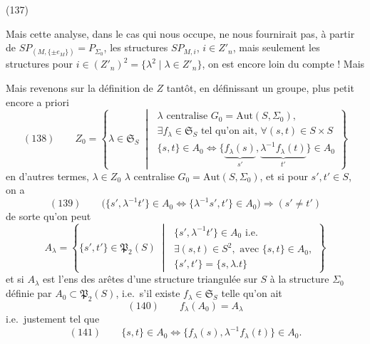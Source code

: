 \documentclass[11pt,a4paper]{article}
\begin{document}
(137)


Mais cette analyse, dans le cas qui nous occupe, ne nous fournirait pas, à partir
de $SP_{(M,\{\pm e_M\})}=P_{\Sigma_0}$,  les structures
$SP_{M,i}$, $i\in Z'_n$, mais seulement les structures pour
$i\in(Z'_n)^{2}=\{\lambda^{2} \mid \lambda\in Z'_n\}$, on est encore loin du
compte ! Mais

Mais revenons sur la définition de $Z$ tantôt, en définissant un 
groupe, plus petit encore a priori
\[
  (138)\qquad Z_0 = \left\{ \lambda\in\mathfrak{S}_S \;\middle|\;
  \begin{array}{l}
    \lambda \text{ centralise } G_0=\mathrm{Aut}(S,\Sigma_0),\\
    \exists f_{\lambda}\in\mathfrak{S}_S \text{ tel qu'on ait, }
      \forall (s,t)\in S\times S\\
    \{s,t\}\in A_0 \Longleftrightarrow
      \{\underbrace{f_{\lambda}(s)}_{s'}, \underbrace{\lambda^{-1}f_{\lambda}(t)}_{t'}\}\in A_0
  \end{array}
  \right\}
\]
en d'autres termes, $\lambda\in Z_0$  $\lambda$ centralise
$G_0=\mathrm{Aut}(S,\Sigma_0)$, et si pour $s',t'\in S$,  on a
\[
  (139)\qquad \bigl(\{s',\lambda^{-1}t'\}\in A_0 \Longleftrightarrow
  \{\lambda^{-1}s',t'\}\in A_0\bigr) \Longrightarrow (s'\neq t')
\]
de sorte qu'on peut  
\[
  A_{\lambda} = \left\{ \{s',t'\}\in\mathfrak{P}_2(S) \;\middle|\;
  \begin{array}{l}
    \{s',\lambda^{-1}t'\}\in A_0 \text{ i.e.}\\
    \exists (s,t)\in S^{2}, \text{ avec } \{s,t\}\in A_0,\\
    \{s',t'\} = \{s,\lambda.t\}
  \end{array}
  \right\}
\]
et si $A_{\lambda}$ est l'ens des arêtes  d'une structure triangulée sur
$S$   à la structure $\Sigma_0$
définie par $A_0\subset\mathfrak{P}_2(S)$, i.e.\ s'il existe
$f_{\lambda}\in\mathfrak{S}_S$ telle qu'on ait
\[
  (140)\qquad f_{\lambda}(A_0) = A_{\lambda}
\]
i.e.\ justement tel que
\[
  (141)\qquad \{s,t\}\in A_0 \Longleftrightarrow
  \{f_{\lambda}(s), \lambda^{-1}f_{\lambda}(t)\}\in A_0 .
\]
\end{document}
